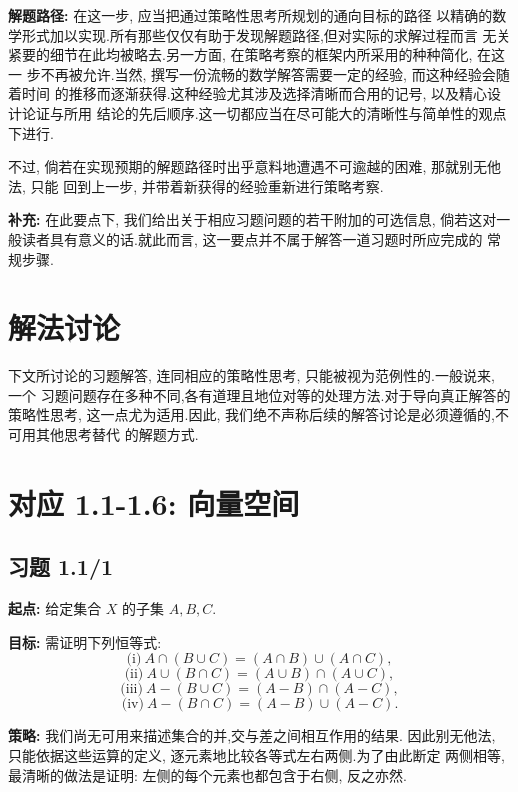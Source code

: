 \noindent\textbf{解题路径:} 在这一步, 应当把通过策略性思考所规划的通向目标的路径
以精确的数学形式加以实现.所有那些仅仅有助于发现解题路径,但对实际的求解过程而言
无关紧要的细节在此均被略去.另一方面, 在策略考察的框架内所采用的种种简化, 在这一
步不再被允许.当然, 撰写一份流畅的数学解答需要一定的经验, 而这种经验会随着时间
的推移而逐渐获得.这种经验尤其涉及选择清晰而合用的记号, 以及精心设计论证与所用
结论的先后顺序.这一切都应当在尽可能大的清晰性与简单性的观点下进行.

不过, 倘若在实现预期的解题路径时出乎意料地遭遇不可逾越的困难, 那就别无他法, 只能
回到上一步, 并带着新获得的经验重新进行策略考察.

\noindent\textbf{补充:} 在此要点下, 我们给出关于相应习题问题的若干附加的可选信息,
倘若这对一般读者具有意义的话.就此而言, 这一要点并不属于解答一道习题时所应完成的
常规步骤.

\section*{解法讨论}

下文所讨论的习题解答, 连同相应的策略性思考, 只能被视为范例性的.一般说来, 一个
习题问题存在多种不同,各有道理且地位对等的处理方法.对于导向真正解答的策略性思考,
这一点尤为适用.因此, 我们绝不声称后续的解答讨论是必须遵循的,不可用其他思考替代
的解题方式.

\section*{对应 1.1-1.6: 向量空间}


\subsection*{习题 1.1/1}

\noindent\textbf{起点:} 给定集合 $X$ 的子集 $A, B, C$.

\noindent\textbf{目标:} 需证明下列恒等式:
\[
\text{(i)}\ A \cap (B \cup C) = (A \cap B) \cup (A \cap C),
\]
\[
\text{(ii)}\ A \cup (B \cap C) = (A \cup B) \cap (A \cup C),
\]
\[
\text{(iii)}\ A - (B \cup C) = (A - B) \cap (A - C),
\]
\[
\text{(iv)}\ A - (B \cap C) = (A - B) \cup (A - C)\text{.}
\]

\noindent\textbf{策略:} 我们尚无可用来描述集合的并,交与差之间相互作用的结果.
因此别无他法, 只能依据这些运算的定义, 逐元素地比较各等式左右两侧.为了由此断定
两侧相等, 最清晰的做法是证明: 左侧的每个元素也都包含于右侧, 反之亦然.

